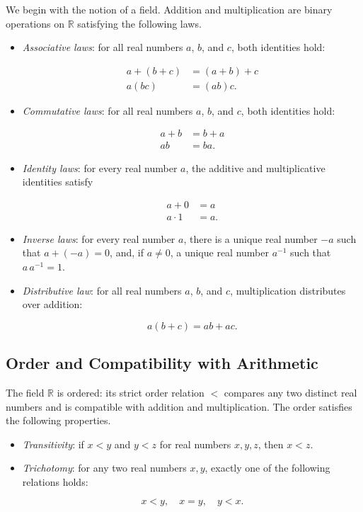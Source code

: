 We begin with the notion of a field. Addition and multiplication are binary operations on $\mathbb{R}$ satisfying the following laws.
\begin{itemize}
\item \textit{Associative laws}: for all real numbers $a$, $b$, and $c$, both identities hold:

\[
\begin{aligned}
a + (b+c) &= (a+b) + c \\
a(bc) &= (ab)c.
\end{aligned}
\]

\item \textit{Commutative laws}: for all real numbers $a$, $b$, and $c$, both identities hold:

\[
\begin{aligned}
a + b &= b + a \\
ab &= ba.
\end{aligned}
\]

\item \textit{Identity laws}: for every real number $a$, the additive and multiplicative identities satisfy

\[
\begin{aligned}
a + 0 &= a \\
a \cdot 1 &= a.
\end{aligned}
\]

\item \textit{Inverse laws}: for every real number $a$, there is a unique real number $-a$ such that $a + (-a) = 0$, and, if $a \neq 0$, a unique real number $a^{-1}$ such that $a \, a^{-1} = 1$.

\item \textit{Distributive law}: for all real numbers $a$, $b$, and $c$, multiplication distributes over addition:

\[
a(b+c) = ab + ac.
\]

\end{itemize}

\subsection{Order and Compatibility with Arithmetic}

The field $\mathbb{R}$ is ordered: its strict order relation $<$ compares any two distinct real numbers and is compatible with addition and multiplication.
The order satisfies the following properties.
\begin{itemize}
\item \textit{Transitivity}: if $x < y$ and $y < z$ for real numbers $x, y, z$, then $x < z$.
\item \textit{Trichotomy}: for any two real numbers $x, y$, exactly one of the following relations holds:

\[
x < y, \quad x = y, \quad y < x.
\]

\end{itemize}

